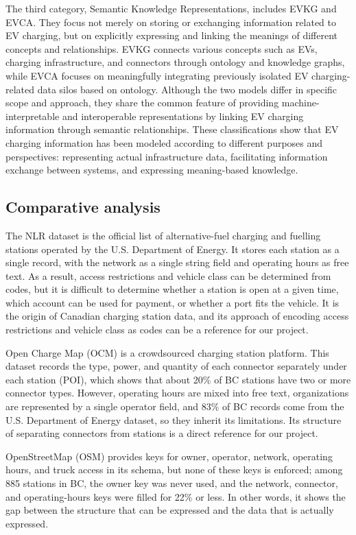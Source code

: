 \documentclass[sigconf]{acmart}
\begin{document}
The third category, Semantic Knowledge Representations, includes EVKG and EVCA. They focus not merely on storing or exchanging information related to EV charging, but on explicitly expressing and linking the meanings of different concepts and relationships. EVKG connects various concepts such as EVs, charging infrastructure, and connectors through ontology and knowledge graphs, while EVCA focuses on meaningfully integrating previously isolated EV charging-related data silos based on ontology. Although the two models differ in specific scope and approach, they share the common feature of providing machine-interpretable and interoperable representations by linking EV charging information through semantic relationships. These classifications show that EV charging information has been modeled according to different purposes and perspectives: representing actual infrastructure data, facilitating information exchange between systems, and expressing meaning-based knowledge.

\subsection{Comparative analysis}

The NLR dataset is the official list of alternative-fuel charging and fuelling stations operated by the U.S. Department of Energy. It stores each station as a single record, with the network as a single string field and operating hours as free text. As a result, access restrictions and vehicle class can be determined from codes, but it is difficult to determine whether a station is open at a given time, which account can be used for payment, or whether a port fits the vehicle. It is the origin of Canadian charging station data, and its approach of encoding access restrictions and vehicle class as codes can be a reference for our project.

Open Charge Map (OCM) is a crowdsourced charging station platform. This dataset records the type, power, and quantity of each connector separately under each station (POI), which shows that about 20\% of BC stations have two or more connector types. However, operating hours are mixed into free text, organizations are represented by a single operator field, and 83\% of BC records come from the U.S. Department of Energy dataset, so they inherit its limitations. Its structure of separating connectors from stations is a direct reference for our project.

OpenStreetMap (OSM) provides keys for owner, operator, network, operating hours, and truck access in its schema, but none of these keys is enforced; among 885 stations in BC, the owner key was never used, and the network, connector, and operating-hours keys were filled for 22\% or less. In other words, it shows the gap between the structure that can be expressed and the data that is actually expressed.
\end{document}
